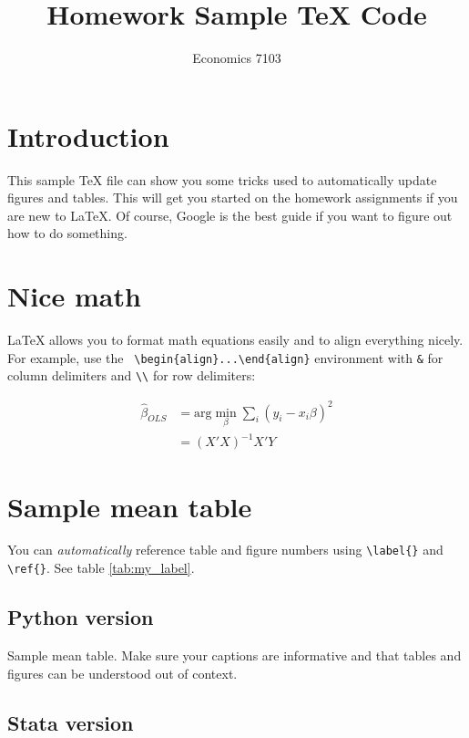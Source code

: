 \documentclass{article}
\title{Homework Sample TeX Code}
\author{Economics 7103}
\date{ }
\begin{document}
  
\maketitle

\section{Introduction}

This sample TeX file can show you some tricks used to automatically update figures and tables.  This will get you started on the homework assignments if you are new to LaTeX.  Of course, Google is the best guide if you want to figure out how to do something.

\section{Nice math}
LaTeX allows you to format math equations easily and to align everything nicely.  For example, use the \verb! \begin{align}...\end{align}! environment with \verb!&! for column delimiters and \verb!\\! for row delimiters:

\begin{align}
    \hat{\beta}_{OLS} &= \text{arg}\min_{\beta} \sum_{i} (y_i - x_i \beta)^2 \\
    &= (X'X)^{-1}X'Y \label{eq:betahat}
\end{align}

\section{Sample mean table}
You can \textit{automatically} reference table and figure numbers using \verb!\label{}! and \verb!\ref{}!. See table \ref{tab:my_label}.

\subsection{Python version}

\begin{table}[ht]
    \centering
    
    \caption{Sample mean table.  Make sure your captions are informative and that tables and figures can be understood out of context.}
    \label{tab:my_label}
\end{table}

\subsection{Stata version}
\end{document}
